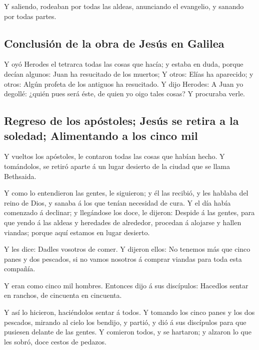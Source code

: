  Y saliendo, rodeaban por todas las aldeas, anunciando el
evangelio, y sanando por todas partes.

\hypertarget{conclusiuxf3n-de-la-obra-de-jesuxfas-en-galilea}{%
\subsection{Conclusión de la obra de Jesús en
Galilea}\label{conclusiuxf3n-de-la-obra-de-jesuxfas-en-galilea}}

 Y oyó Herodes el tetrarca todas las cosas que hacía; y
estaba en duda, porque decían algunos: Juan ha resucitado de los
muertos;  Y otros: Elías ha aparecido; y otros: Algún
profeta de los antiguos ha resucitado.  Y dijo Herodes: A
Juan yo degollé: ¿quién pues será éste, de quien yo oigo tales cosas? Y
procuraba verle.

\hypertarget{regreso-de-los-apuxf3stoles-jesuxfas-se-retira-a-la-soledad-alimentando-a-los-cinco-mil}{%
\subsection{Regreso de los apóstoles; Jesús se retira a la soledad;
Alimentando a los cinco
mil}\label{regreso-de-los-apuxf3stoles-jesuxfas-se-retira-a-la-soledad-alimentando-a-los-cinco-mil}}

 Y vueltos los apóstoles, le contaron todas las cosas que
habían hecho. Y tomándolos, se retiró aparte á un lugar desierto de la
ciudad que se llama Bethsaida.

 Y como lo entendieron las gentes, le siguieron; y él las
recibió, y les hablaba del reino de Dios, y sanaba á los que tenían
necesidad de cura.  Y el día había comenzado á declinar; y
llegándose los doce, le dijeron: Despide á las gentes, para que yendo á
las aldeas y heredades de alrededor, procedan á alojarse y hallen
viandas; porque aquí estamos en lugar desierto.

 Y les dice: Dadles vosotros de comer. Y dijeron ellos: No
tenemos más que cinco panes y dos pescados, si no vamos nosotros á
comprar viandas para toda esta compañía.

 Y eran como cinco mil hombres. Entonces dijo á sus
discípulos: Hacedlos sentar en ranchos, de cincuenta en cincuenta.

 Y así lo hicieron, haciéndolos sentar á todos.
 Y tomando los cinco panes y los dos pescados, mirando al
cielo los bendijo, y partió, y dió á sus discípulos para que pusiesen
delante de las gentes.  Y comieron todos, y se hartaron; y
alzaron lo que les sobró, doce cestos de pedazos.

